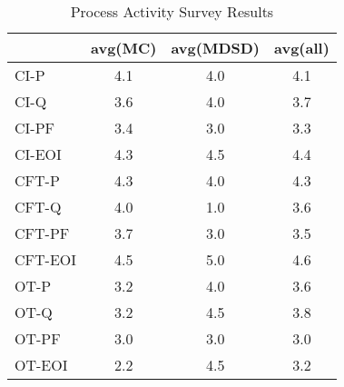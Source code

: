 \documentclass[final_report_innit.tex]{subfiles}
\begin{document}
\begin{table}[h]
\caption{Process Activity Survey Results}
\centering
\begin{tabular}{@{}l|c|c|c|@{}}
\cmidrule(l){2-4}
                             & \multicolumn{1}{l|}{avg(MC)} & \multicolumn{1}{l|}{avg(MDSD)} & \multicolumn{1}{l|}{avg(all)} \\ \midrule
\multicolumn{1}{|l|}{CI-P}   & 4.1                          & 4.0                           & 4.1                           \\ \midrule
\multicolumn{1}{|l|}{CI-Q}   & 3.6                          & 4.0                           & 3.7                           \\ \midrule
\multicolumn{1}{|l|}{CI-PF}  & 3.4                          & 3.0                           & 3.3                           \\ \midrule
\multicolumn{1}{|l|}{CI-EOI} & 4.3                          & 4.5                           & 4.4                           \\ \midrule
\multicolumn{1}{|l|}{CFT-P}   & 4.3                          & 4.0                           & 4.3                           \\ \midrule
\multicolumn{1}{|l|}{CFT-Q}   & 4.0                          & 1.0                           & 3.6                           \\ \midrule
\multicolumn{1}{|l|}{CFT-PF}  & 3.7                          & 3.0                           & 3.5                           \\ \midrule
\multicolumn{1}{|l|}{CFT-EOI} & 4.5                          & 5.0                           & 4.6                           \\ \midrule
\multicolumn{1}{|l|}{OT-P}   & 3.2                          & 4.0                           & 3.6                           \\ \midrule
\multicolumn{1}{|l|}{OT-Q}   & 3.2                          & 4.5                           & 3.8                           \\ \midrule
\multicolumn{1}{|l|}{OT-PF}  & 3.0                          & 3.0                           & 3.0                           \\ \midrule
\multicolumn{1}{|l|}{OT-EOI} & 2.2                          & 4.5                           & 3.2                           \\ \bottomrule
\end{tabular}
\end{table}
\end{document}
